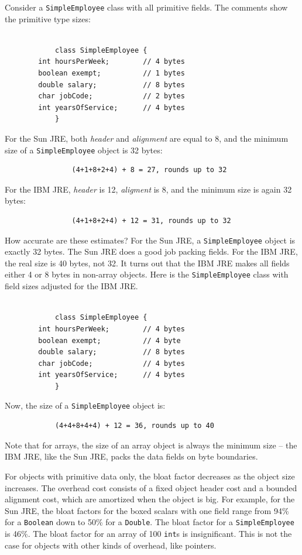 \begin{example}
Consider a \texttt{SimpleEmployee} class with all primitive fields. The comments show the primitive type sizes:

\ttfamily
\begin{verbatim} 

			class SimpleEmployee {
        int hoursPerWeek;        // 4 bytes 
        boolean exempt;          // 1 bytes
        double salary;           // 8 bytes
        char jobCode;            // 2 bytes
        int yearsOfService;      // 4 bytes
			}
\end{verbatim}
\normalfont
For the Sun JRE, both \textit{header} and \textit{alignment} are equal to 8, and the minimum size of a \texttt{SimpleEmployee} object is 32 bytes:
\begin{verbatim}
                (4+1+8+2+4) + 8 = 27, rounds up to 32
\end{verbatim} 
For the IBM JRE, \textit{header} is 12, \textit{aligment} is 8, and the minimum size is again 32 bytes:
\begin{verbatim}
                (4+1+8+2+4) + 12 = 31, rounds up to 32
\end{verbatim} 
\end{example}
How accurate are these estimates?  For the Sun JRE, a \texttt{SimpleEmployee} object is exactly 32 bytes. The Sun JRE does a good job packing fields. For the IBM JRE, the real size is 40 bytes, not 32. It turns out that the IBM JRE makes all fields either 4 or 8 bytes in non-array objects.  Here is the \texttt{SimpleEmployee} class with field sizes adjusted for the IBM JRE. 
\ttfamily
\begin{verbatim} 

			class SimpleEmployee {
        int hoursPerWeek;        // 4 bytes
        boolean exempt;          // 4 byte
        double salary;           // 8 bytes
        char jobCode;            // 4 bytes
        int yearsOfService;      // 4 bytes
			}
\end{verbatim}
\normalfont
Now, the size of a \texttt{SimpleEmployee} object is:
\begin{verbatim}
            (4+4+8+4+4) + 12 = 36, rounds up to 40
\end{verbatim}
Note that for arrays, the size of an array object is always the minimum size -- the IBM JRE, like the Sun JRE, packs the data fields on byte boundaries.

For objects with primitive data only, the bloat factor decreases as the object size increases. The overhead cost consists of a fixed object header cost and a bounded alignment cost, which are amortized when the object is big.  For example, for the Sun JRE, the bloat factors for the boxed scalars with one field range from 94\% for a \texttt{Boolean} down to 50\% for a \texttt{Double}.  The bloat factor for a \texttt{SimpleEmployee} is 46\%.  The bloat factor for an array of 100 \texttt{int}s is insignificant. This is not the case for objects with other kinds of overhead, like pointers.

